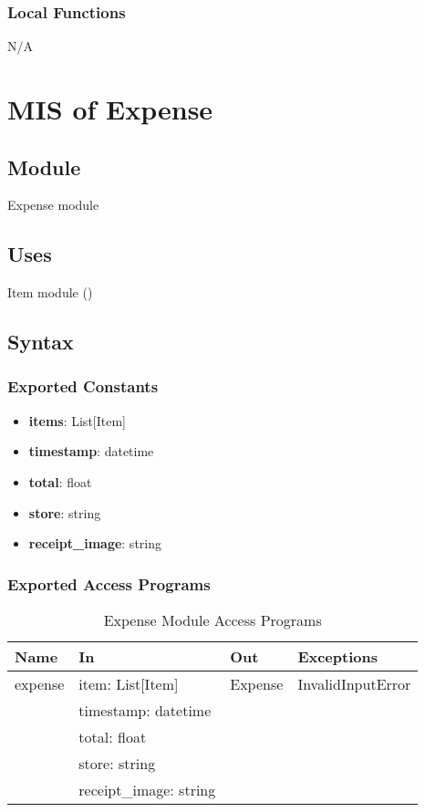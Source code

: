 \documentclass[12pt, titlepage]{article}
\begin{document}
\subsubsection{Local Functions}
N/A

\newpage

\section{MIS of Expense}\label{expense_module}

\subsection{Module}

Expense module

\subsection{Uses}
Item module ()

\subsection{Syntax}

\subsubsection{Exported Constants}
\begin{itemize}
  \item \textbf{items}: List[Item]
  \item \textbf{timestamp}: datetime
  \item \textbf{total}: float
  \item \textbf{store}: string
  \item \textbf{receipt\_image}: string
\end{itemize}

\subsubsection{Exported Access Programs}

\begin{center}
  \begin{table}[H]
    \caption{Expense Module Access Programs}
\begin{tabular}{p{4cm} p{4cm} p{4cm} p{4cm}}
\hline
\textbf{Name} & \textbf{In} & \textbf{Out} & \textbf{Exceptions} \\
\hline
expense & item: List[Item] & Expense & InvalidInputError \\
  & timestamp: datetime &  &  \\
  & total: float &  &  \\
  & store: string &  &  \\
  & receipt\_image: string &  &  \\
\hline
\end{tabular}
\end{table}
\end{center}
\end{document}
